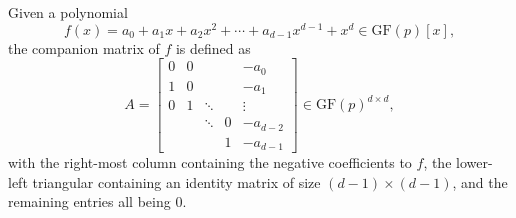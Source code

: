 \begin{definition}
    Given a polynomial
    \begin{equation}
        f(x) = a_0 + a_1x + a_2x^2 + \cdots + a_{d-1}x^{d-1} + x^d \in \mathrm{GF}(p)[x],
    \end{equation}
    the companion matrix of $f$ is defined as
    \begin{equation}
        A = \left[\begin{matrix}
            0 & 0 & & & -a_0 \\
            1 & 0 & & & -a_1 \\
            0 & 1 & \ddots & & \vdots \\
            & & \ddots & 0 & -a_{d-2} \\
            & & & 1 & -a_{d-1}
        \end{matrix}\right] \in \mathrm{GF}(p)^{d\times d},
    \end{equation}
    with the right-most column containing the negative coefficients to $f$, the lower-left triangular containing an identity matrix of size $(d-1)\times(d-1)$, and the remaining entries all being 0.
\end{definition}

